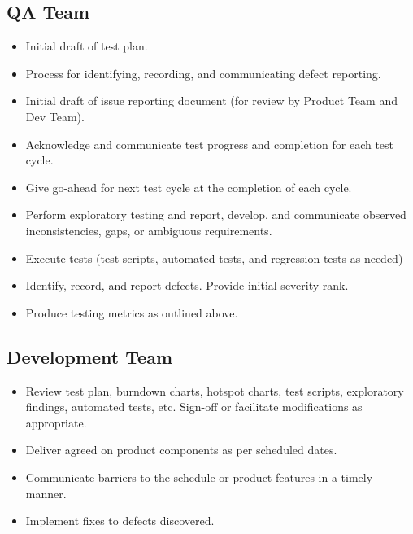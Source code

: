 \documentclass[letterpaper,10pt,english]{sphinxmanual}
\begin{document}
\subsection{QA Team}
\label{\detokenize{test_plan/roles_and_responsibilities:qa-team}}
\begin{itemize}
\item {} 
Initial draft of test plan.

\item {} 
Process for identifying, recording, and communicating defect reporting.

\item {} 
Initial draft of issue reporting document (for review by Product Team and Dev Team).

\item {} 
Acknowledge and communicate test progress and completion for each test cycle.

\item {} 
Give go-ahead for next test cycle at the completion of each cycle.

\item {} 
Perform exploratory testing and report, develop, and communicate observed inconsistencies, gaps, or ambiguous requirements.

\item {} 
Execute tests (test scripts, automated tests, and regression tests as needed)

\item {} 
Identify, record, and report defects. Provide initial severity rank.

\item {} 
Produce testing metrics as outlined above.

\end{itemize}


\subsection{Development Team}
\label{\detokenize{test_plan/roles_and_responsibilities:development-team}}
\begin{itemize}
\item {} 
Review test plan, burndown charts, hotspot charts, test scripts, exploratory findings, automated tests, etc.  Sign-off or facilitate modifications as appropriate.

\item {} 
Deliver agreed on product components as per scheduled dates.

\item {} 
Communicate barriers to the schedule or product features in a timely manner.

\item {} 
Implement fixes to defects discovered.

\end{itemize}
\end{document}
